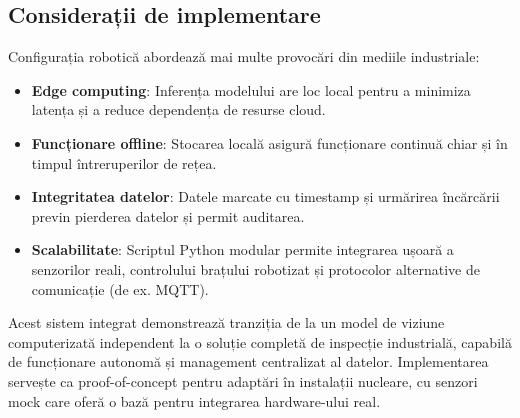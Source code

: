 \documentclass[12pt,a4paper]{article}
\begin{document}
\subsection{Considerații de implementare}

Configurația robotică abordează mai multe provocări din mediile industriale:
\begin{itemize}
\item \textbf{Edge computing}: Inferența modelului are loc local pentru a minimiza latența și a reduce dependența de resurse cloud.
\item \textbf{Funcționare offline}: Stocarea locală asigură funcționare continuă chiar și în timpul întreruperilor de rețea.
\item \textbf{Integritatea datelor}: Datele marcate cu timestamp și urmărirea încărcării previn pierderea datelor și permit auditarea.
\item \textbf{Scalabilitate}: Scriptul Python modular permite integrarea ușoară a senzorilor reali, controlului brațului robotizat și protocolor alternative de comunicație (de ex. MQTT).
\end{itemize}

Acest sistem integrat demonstrează tranziția de la un model de viziune computerizată independent la o soluție completă de inspecție industrială, capabilă de funcționare autonomă și management centralizat al datelor. Implementarea servește ca proof-of-concept pentru adaptări în instalații nucleare, cu senzori mock care oferă o bază pentru integrarea hardware-ului real.
\end{document}

